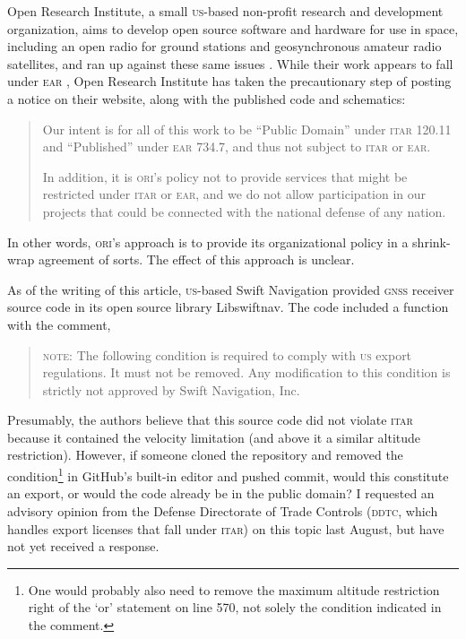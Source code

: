 \documentclass[preprint,twocolumn,5p]{elsarticle}
\begin{document}
Open Research Institute, a small \textsc{us}-based non-profit research and development organization, aims to develop open source software and hardware for use in space, including an open radio for ground stations and geosynchronous amateur radio satellites, and ran up against these same issues \citep{ORIBlog}. While their work appears to fall under \textsc{ear} \citep{ORIDDTC}, Open Research Institute has taken the precautionary step of posting a notice on their website, along with the published code and schematics:
\begin{quote}
Our intent is for all of this work to be ``Public Domain'' under \textsc{itar} 120.11 and ``Published'' under \textsc{ear} 734.7, and thus not subject to \textsc{itar} or \textsc{ear}.

In addition, it is \textsc{ori}'s policy not to provide services that might be restricted under \textsc{itar} or \textsc{ear}, and we do not allow participation in our projects that could be connected with the national defense of any nation. \citep{ORIStatement}
\end{quote}
In other words, \textsc{ori}'s approach is to provide its organizational policy in a shrink-wrap agreement of sorts. The effect of this approach is unclear.

As of the writing of this article, \textsc{us}-based Swift Navigation provided \textsc{gnss} receiver source code in its open source library Libswiftnav. The code included a function with the comment,
\begin{quote}
\textsc{note}: The following condition is required to comply with \textsc{us} export regulations. It must not be removed. Any modification to this condition is strictly not approved by Swift Navigation, Inc. \citep{Libswiftnav575}
\end{quote}
Presumably, the authors believe that this source code did not violate \textsc{itar} because it contained the velocity limitation (and above it a similar altitude restriction). However, if someone cloned the repository and removed the condition\footnote{One would probably also need to remove the maximum altitude restriction right of the `or' statement on line 570, not solely the condition indicated in the comment.} in GitHub's built-in editor and pushed commit, would this constitute an export, or would the code already be in the public domain? I requested an advisory opinion from the Defense Directorate of Trade Controls (\textsc{ddtc}, which handles export licenses that fall under \textsc{itar}) on this topic last August, but have not yet received a response.
\end{document}
